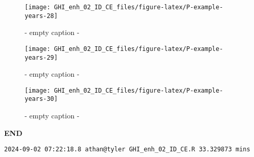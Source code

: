 \documentclass[
  10pt,
  a4paper,oneside]{article}
\begin{document}
\begin{figure}[H]

{\centering \texttt{[image: GHI\_enh\_02\_ID\_CE\_files/figure-latex/P-example-years-28]} 

}

\caption{ - empty caption - }\label{fig:P-example-years-28}
\end{figure}
\begin{figure}[H]

{\centering \texttt{[image: GHI\_enh\_02\_ID\_CE\_files/figure-latex/P-example-years-29]} 

}

\caption{ - empty caption - }\label{fig:P-example-years-29}
\end{figure}
\begin{figure}[H]

{\centering \texttt{[image: GHI\_enh\_02\_ID\_CE\_files/figure-latex/P-example-years-30]} 

}

\caption{ - empty caption - }\label{fig:P-example-years-30}
\end{figure}

\textbf{END}

\begin{verbatim}
2024-09-02 07:22:18.8 athan@tyler GHI_enh_02_ID_CE.R 33.329873 mins
\end{verbatim}
\end{document}
